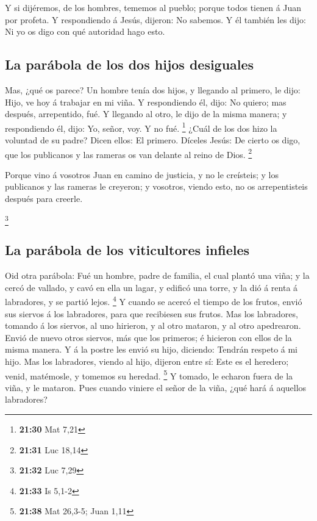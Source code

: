  Y si dijéremos, de los hombres, tememos al pueblo; porque
todos tienen á Juan por profeta.  Y respondiendo á Jesús,
dijeron: No sabemos. Y él también les dijo: Ni yo os digo con qué
autoridad hago esto.

\hypertarget{la-paruxe1bola-de-los-dos-hijos-desiguales}{%
\subsection{La parábola de los dos hijos
desiguales}\label{la-paruxe1bola-de-los-dos-hijos-desiguales}}

 Mas, ¿qué os parece? Un hombre tenía dos hijos, y llegando
al primero, le dijo: Hijo, ve hoy á trabajar en mi viña.  Y
respondiendo él, dijo: No quiero; mas después, arrepentido, fué.
 Y llegando al otro, le dijo de la misma manera; y
respondiendo él, dijo: Yo, señor, voy. Y no fué. \footnote{\textbf{21:30}
  Mat 7,21}  ¿Cuál de los dos hizo la voluntad de su padre?
Dicen ellos: El primero. Díceles Jesús: De cierto os digo, que los
publicanos y las rameras os van delante al reino de Dios. \footnote{\textbf{21:31}
  Luc 18,14}

 Porque vino á vosotros Juan en camino de justicia, y no le
creísteis; y los publicanos y las rameras le creyeron; y vosotros,
viendo esto, no os arrepentisteis después para creerle.

\footnote{\textbf{21:32} Luc 7,29}

\hypertarget{la-paruxe1bola-de-los-viticultores-infieles}{%
\subsection{La parábola de los viticultores
infieles}\label{la-paruxe1bola-de-los-viticultores-infieles}}

 Oid otra parábola: Fué un hombre, padre de familia, el
cual plantó una viña; y la cercó de vallado, y cavó en ella un lagar, y
edificó una torre, y la dió á renta á labradores, y se partió lejos.
\footnote{\textbf{21:33} Is 5,1-2}  Y cuando se acercó el
tiempo de los frutos, envió sus siervos á los labradores, para que
recibiesen sus frutos.  Mas los labradores, tomando á los
siervos, al uno hirieron, y al otro mataron, y al otro apedrearon.
 Envió de nuevo otros siervos, más que los primeros; é
hicieron con ellos de la misma manera.  Y á la postre les
envió su hijo, diciendo: Tendrán respeto á mi hijo.  Mas
los labradores, viendo al hijo, dijeron entre sí: Este es el heredero;
venid, matémosle, y tomemos su heredad. \footnote{\textbf{21:38} Mat
  26,3-5; Juan 1,11}  Y tomado, le echaron fuera de la
viña, y le mataron.  Pues cuando viniere el señor de la
viña, ¿qué hará á aquellos labradores?

